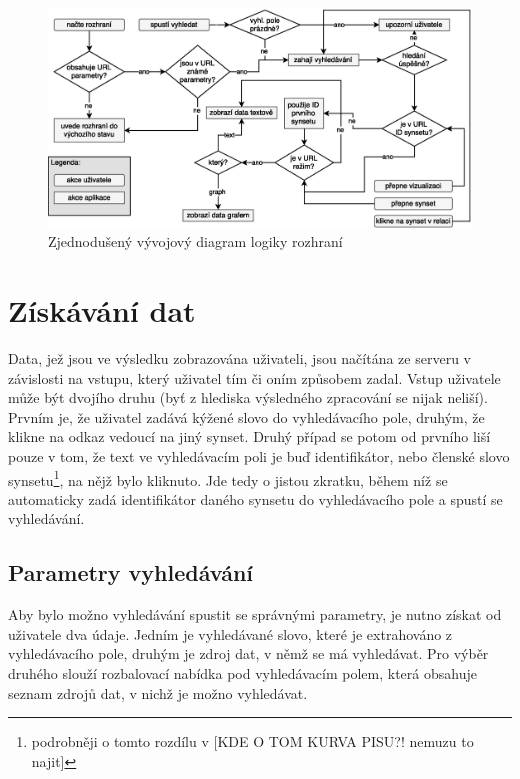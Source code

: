 \documentclass[a4paper, 11pt, oneside]{book}
\begin{document}
			\begin{figure}[h]
				\centering
				\includegraphics[width=1.0\textwidth]{wordnet-ui-diag_v2.eps}
				\caption{Zjednodušený vývojový diagram logiky rozhraní}
				\label{fig:wordnet-ui-diag}
			\end{figure}

			\section{Získávání dat}
				
				Data, jež jsou ve výsledku zobrazována uživateli, jsou načítána ze serveru v závislosti na vstupu, který uživatel tím či oním způsobem zadal. Vstup uživatele může být dvojího druhu (byť z hlediska výsledného zpracování se nijak neliší). Prvním je, že uživatel zadává kýžené slovo do vyhledávacího pole, druhým, že klikne na odkaz vedoucí na jiný synset. Druhý případ se potom od prvního liší pouze v tom, že text ve vyhledávacím poli je buď identifikátor, nebo členské slovo synsetu\footnote{podrobněji o tomto rozdílu v [KDE O TOM KURVA PISU?! nemuzu to najit]}, na nějž bylo kliknuto. Jde tedy o jistou zkratku, během níž se automaticky zadá identifikátor daného synsetu do vyhledávacího pole a spustí se vyhledávání.

				\subsection{Parametry vyhledávání}
				
					Aby bylo možno vyhledávání spustit se správnými parametry, je nutno získat od uživatele dva údaje. Jedním je vyhledávané slovo, které je extrahováno z vyhledávacího pole, druhým je zdroj dat, v němž se má vyhledávat. Pro výběr druhého slouží rozbalovací nabídka pod vyhledávacím polem, která obsahuje seznam zdrojů dat, v nichž je možno vyhledávat.
\end{document}
